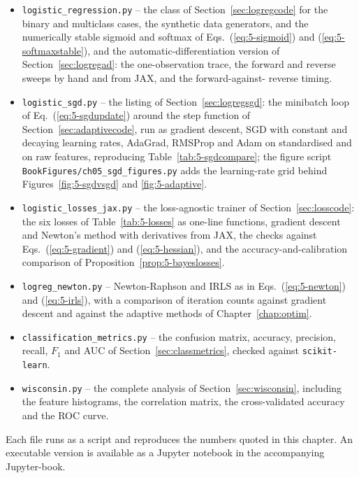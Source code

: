 \begin{itemize}
  \item \texttt{logistic\_regression.py} -- the class of
        Section~\ref{sec:logregcode} for the binary and multiclass cases, the
        synthetic data generators, and the numerically stable sigmoid and
        softmax of Eqs.~(\ref{eq:5-sigmoid}) and (\ref{eq:5-softmaxstable}),
        and the automatic-differentiation version of
        Section~\ref{sec:logregad}: the one-observation trace, the forward
        and reverse sweeps by hand and from JAX, and the forward-against-
        reverse timing.
  \item \texttt{logistic\_sgd.py} -- the listing of
        Section~\ref{sec:logregsgd}: the minibatch loop of
        Eq.~(\ref{eq:5-sgdupdate}) around the step function of
        Section~\ref{sec:adaptivecode}, run as gradient descent, SGD with
        constant and decaying learning rates, AdaGrad, RMSProp and Adam on
        standardised and on raw features, reproducing
        Table~\ref{tab:5-sgdcompare}; the figure script
        \texttt{BookFigures/ch05\_sgd\_figures.py} adds the learning-rate
        grid behind Figures~\ref{fig:5-sgdvsgd} and \ref{fig:5-adaptive}.
  \item \texttt{logistic\_losses\_jax.py} -- the loss-agnostic trainer of
        Section~\ref{sec:losscode}: the six losses of Table~\ref{tab:5-losses}
        as one-line functions, gradient descent and Newton's method with
        derivatives from JAX, the checks against Eqs.~(\ref{eq:5-gradient})
        and (\ref{eq:5-hessian}), and the accuracy-and-calibration
        comparison of Proposition~\ref{prop:5-bayeslosses}.
  \item \texttt{logreg\_newton.py} -- Newton-Raphson and IRLS as in
        Eqs.~(\ref{eq:5-newton}) and (\ref{eq:5-irls}), with a comparison of
        iteration counts against gradient descent and against the adaptive
        methods of Chapter~\ref{chap:optim}.
  \item \texttt{classification\_metrics.py} -- the confusion matrix, accuracy,
        precision, recall, $F_1$ and AUC of Section~\ref{sec:classmetrics},
        checked against \texttt{scikit-learn}.
  \item \texttt{wisconsin.py} -- the complete analysis of
        Section~\ref{sec:wisconsin}, including the feature histograms, the
        correlation matrix, the cross-validated accuracy and the ROC curve.
\end{itemize}

Each file runs as a script and reproduces the numbers quoted in this chapter.
An executable version is available as a Jupyter notebook in the accompanying
Jupyter-book.

